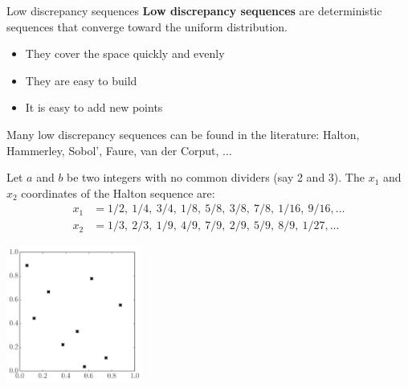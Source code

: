 \begin{frame}{Low discrepancy sequences}
\textbf{Low discrepancy sequences} are deterministic sequences that converge toward the uniform distribution.
\begin{itemize}
	\item They cover the space quickly and evenly
	\item They are easy to build
	\item It is easy to add new points
\end{itemize}
\vspace{5mm}
Many low discrepancy sequences can be found in the literature: Halton, Hammerley, Sobol', Faure, van der Corput, ...
\end{frame}

\begin{frame}{}
\begin{example}
	Let $a$ and $b$ be two integers with no common dividers (say 2 and 3). The $x_1$ and $x_2$ coordinates of the Halton sequence are:
	\begin{equation*}
		\begin{split}
			x_1 &= 1/2,\ 1/4,\ 3/4,\ 1/8,\ 5/8,\ 3/8,\ 7/8,\ 1/16,\ 9/16, \dots\\
			x_2 &= 1/3,\ 2/3,\ 1/9,\ 4/9,\ 7/9,\ 2/9,\ 5/9,\ 8/9,\ 1/27, \dots
		\end{split}
	\end{equation*}
\begin{center}
\includegraphics[height=4.5cm]{2_Design_of_experiments/figures/python/spf_halton}
\end{center}

\end{example}
\end{frame}

